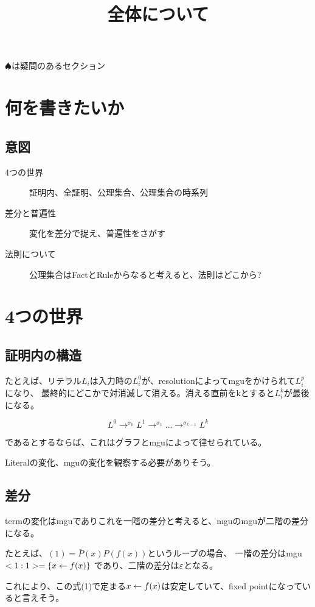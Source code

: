 \documentclass[10pt, oneside]{jarticle}   	%
\title{全体について}
\author{\myname}
\begin{document}
\maketitle

\tableofcontents
$\spadesuit$は疑問のあるセクション
\newpage

\section{何を書きたいか}
\subsection{意図}
\begin{description}
\item[ 4つの世界] 証明内、全証明、公理集合、公理集合の時系列 
\item[ 差分と普遍性] 変化を差分で捉え、普遍性をさがす
\item[ 法則について] 公理集合はFactとRuleからなると考えると、法則はどこから?
\end{description}



\section{4つの世界}
\subsection{証明内の構造}
たとえば、リテラル$L_i$は入力時の$L^0_i$が、resolutionによってmguをかけられて$L^p_i$になり、
最終的にどこかで対消滅して消える。消える直前をkとすると$L^k_i$が最後になる。

$$L^0 \to^{\sigma_0} L^1 \to^{\sigma_1} \dots \to^{\sigma_{k-1}} L^k$$

であるとするならば、これはグラフとmguによって律せられている。

Literalの変化、mguの変化を観察する必要がありそう。

\subsection{差分}
termの変化はmguでありこれを一階の差分と考えると、mguのmguが二階の差分になる。

たとえば、$(1) = \bar{P}(x)P(f(x))$というループの場合、
一階の差分はmgu$<1:1> = \{x \leftarrow f(x)\}$
であり、二階の差分は$\varepsilon$となる。

これにより、この式(1)で定まる$x \leftarrow f(x)$は安定していて、fixed pointになっていると言えそう。
\end{document}
